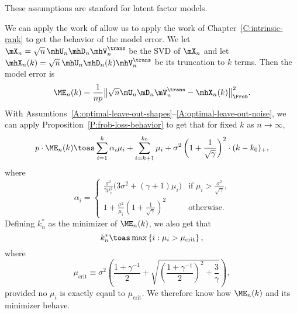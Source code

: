 \noindent
These assumptions are stanford for latent factor models.

We can apply the work of allow us to apply the work of
Chapter~\ref{C:intrinsic-rank} to get the behavior of the model error.
    We
let $\mX_n = \sqrt{n} \, \mhU_n \mhD_n \mhV_n^\trans$ be the SVD of $\mX_n$ and let $\mhX_n(k) = \sqrt{n} \, \mhU_n \mhD_n(k) \mhV_n^\trans$ be its truncation to $k$ terms.  Then the model error is
\[
    {\ME}_n (k)
        = 
            \frac{1}{n p} 
            \big\| 
                \sqrt{n} \mU_n \mD_n \mV_n^\trans 
                - 
                \mhX_n(k)
            \big\|_\Frob^2.
\]
With Assumtions~\ref{A:optimal-leave-out-shapes}--\ref{A:optimal-leave-out-noise}, we can apply Proposition~\ref{P:frob-loss-behavior} to get that for fixed
$k$ as $n \to \infty$,
\[
    p \cdot {\ME}_n (k)
        \toas
        \sum_{i=1}^{k}
            \alpha_i \mu_i
        +
        \sum_{i=k+1}^{k_0}
            \mu_i
        +
        \sigma^2
        \left(
            1 + \frac{1}{\sqrt{\gamma}}
        \right)^2
        \cdot
        (k - k_0)_+,
\]
where
\[
    \alpha_i 
    =
    \begin{cases}
        \frac{\sigma^2}{\gamma \mu_i^2}
                \big(
                    3 \sigma^2 + (\gamma+1) \mu_i
                \big)
            &\text{if $\mu_i > \frac{\sigma^2}{\sqrt{\gamma}}$,} \\
        1 
        + 
        \frac{\sigma^2}{\mu_i}
        \left(
            1
            +
            \frac{1}{\sqrt{\gamma}}
        \right)^2
            &\text{otherwise.}
    \end{cases}
\]
Defining $k_n^\ast$ as the minimizer of ${\ME}_n(k)$, we also get that
\[
    k_n^\ast
        \toas
            \max \left\{ i : \mu_i > \mu_\text{crit} \right\},
\]
where
\[
    \mu_\text{crit}
    \equiv
    \sigma^2
    \left(
    \frac{1 + \gamma^{-1}}{2}
    +
    \sqrt{ 
        \left( \frac{1 + \gamma^{-1} }{2} \right)^2
        +
        \frac{3}{\gamma}
    }
    \right),
\]
provided no $\mu_i$ is exactly eqaul to $\mu_\text{crit}$.  We therefore know
how ${\ME}_n(k)$ and its minimizer behave.

